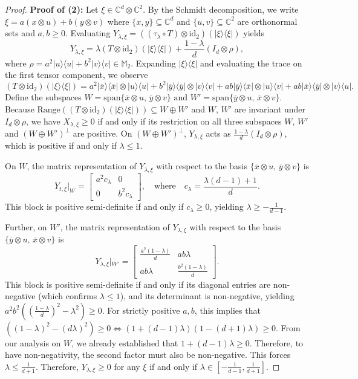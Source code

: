 \documentclass[11pt,reqno]{amsart}
\theoremstyle{definition}
\theoremstyle{plain}
\theoremstyle{remark}
\newcommand{\la}{\langle}
\newcommand{\ra}{\rangle}
\numberwithin{equation}{section}%
\begin{document}
\begin{proof}
  	\noindent\textbf{Proof of (2):} Let $\xi \in \mathbb{C}^d \otimes \mathbb{C}^2$. By the Schmidt decomposition, we write $\xi = a(x \otimes u) + b(y \otimes v)$ where $\{x, y\} \subseteq\mathbb{C}^d$ and $\{u, v\} \subseteq \mathbb{C}^2$ are orthonormal sets and $a, b \ge 0$. Evaluating $Y_{\lambda,\xi} = ((\tau_\lambda\circ T)\otimes \text{id}_{2})(|\xi\ra\la\xi|)$ yields
  	\[
 	Y_{\lambda,\xi} = \lambda(T\otimes \text{id}_{2})(|\xi\ra\la\xi|) + \frac{1-\lambda}{d}(I_d\otimes \rho),
  	\]
  	where $\rho = a^2|u\ra\la u| + b^2|v\ra\la v|\in \mathbb{M}_2$. Expanding $|\xi\ra\la\xi|$ and evaluating the trace on the first tensor component, we observe 
  	\[(T\otimes \text{id}_{2})(|\xi\ra\la\xi|) = a^2 |\overline{x}\ra\la \overline{x}|\otimes|u\ra\la u|+ b^2 |\overline{y}\ra\la \overline{y}| \otimes |v\ra\la v|+ ab |\overline{y}\ra\la \overline{x}|\otimes |u\ra\la v| + ab |\overline{x}\ra\la \overline{y}|\otimes |v\ra\la u|.\]Define the subspaces $W = \text{span}\{ \overline{x}\otimes u, \, \overline{y}\otimes v\}\text{ and }W' = \text{span}\{\overline{y}\otimes u, \, \overline{x}\otimes v\}$. Because $\text{Range}((T\otimes \text{id}_{2})(|\xi\ra\la\xi|)) \subseteq W\oplus W'$ and $W$, $W'$ are invariant under $I_d \otimes \rho$, we have $X_{\lambda,\xi} \ge 0$ if and only if its restriction on all three subspaces $W$, $W'$ and $(W\oplus W')^\perp$ are positive. On $(W\oplus W')^\perp$, $Y_{\lambda,\xi}$ acts as $\frac{1-\lambda}{d}(I_d \otimes \rho)$, which is positive if and only if $\lambda \le 1$. 
  	
  	On $W$, the matrix representation of $Y_{\lambda,\xi}$ with respect to the basis $\{ \overline{x}\otimes u, \, \overline{y}\otimes v\}$ is
  	\[
  	Y_{t,\xi}|_W = \begin{bmatrix}
  		a^2 c_\lambda & 0 \\
  		0 & b^2 c_\lambda
  	\end{bmatrix}, \quad \text{where} \quad c_\lambda= \frac{\lambda(d-1)+1}{d}.
  	\]
  	This block is positive semi-definite if and only if $c_\lambda\ge 0$, yielding $ \lambda \ge -\frac{1}{d-1}$. 
  	
  	Further, on $W'$, the matrix representation of $Y_{\lambda,\xi}$ with respect to the basis $\{\overline{y}\otimes u, \, \overline{x}\otimes v\}$ is
  	\[Y_{\lambda,\xi}\vert{}_{W'} = \begin{bmatrix} \frac{a^2 (1-\lambda)}{d} & ab\lambda\\ ab\lambda & \frac{b^2(1-\lambda)}{d} \end{bmatrix}.\]
  	This block is positive semi-definite if and only if its diagonal entries are non-negative (which confirms $\lambda  \le 1$), and its determinant is non-negative, yielding $a^2b^2((\frac{1-\lambda}{d})^2 - \lambda^2) \ge 0$. For strictly positive $a, b$, this implies that $((1-\lambda)^2-(d\lambda)^2)\ge0\Leftrightarrow\left(1 + (d-1)\lambda\right)\left(1 - (d+1)\lambda\right) \ge 0$. From our analysis on $W$, we already established that $1 + (d-1)\lambda \ge 0$. Therefore, to have non-negativity, the second factor must also be non-negative. This forces $\lambda \le \frac{1}{d+1}$. Therefore, $Y_{\lambda,\xi} \ge 0$ for any $\xi$ if and only if $\lambda \in \left[-\frac{1}{d-1}, \frac{1}{d+1}\right]$.
  	

\end{proof}
\end{document}
